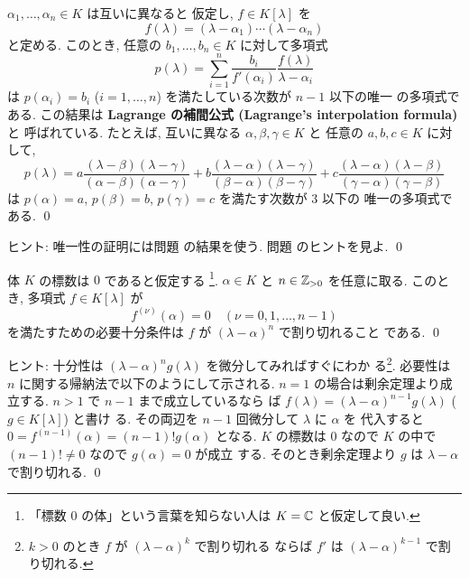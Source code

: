 \documentclass[12pt,twoside]{jarticle}
\begin{document}
\begin{question}
\label{q:Lagrange-interpolation-2}
  $\alpha_1,\dots,\alpha_n\in K$ は互いに異なると
  仮定し, $f\in K[\lambda]$ を
  \begin{equation*}
    f(\lambda)=(\lambda-\alpha_1)\cdots(\lambda-\alpha_n)
  \end{equation*}
  と定める. このとき, 任意の $b_1,\dots,b_n\in K$ に対して多項式
  \begin{equation*}
    p(\lambda) = 
    \sum_{i=1}^n 
    \frac{b_i}{f'(\alpha_i)}
    \frac{f(\lambda)}{\lambda-\alpha_i}
  \end{equation*}
  は $p(\alpha_i)=b_i$ ($i=1,\dots,n$) を満たしている次数が $n-1$ 以下の唯一
  の多項式である.
  この結果は {\bf Lagrange の補間公式 (Lagrange's interpolation formula)} と
  呼ばれている.   
  たとえば, 互いに異なる $\alpha,\beta,\gamma\in K$ と
  任意の $a,b,c\in K$ に対して,
  \begin{equation*}
    p(\lambda)=
    a \frac{(\lambda-\beta)(\lambda-\gamma)}{(\alpha-\beta)(\alpha-\gamma)} +
    b \frac{(\lambda-\alpha)(\lambda-\gamma)}{(\beta-\alpha)(\beta-\gamma)} +
    c \frac{(\lambda-\alpha)(\lambda-\beta)}{(\gamma-\alpha)(\gamma-\beta)} 
  \end{equation*}
  は $p(\alpha)=a$, $p(\beta)=b$, $p(\gamma)=c$ を満たす次数が $3$ 以下の
  唯一の多項式である. 
  \qed
\end{question}

\noindent
ヒント: 唯一性の証明には問題  の結果を使う.
問題  のヒントを見よ.
\qed


\begin{question}
\label{q:Lagrange-interpolation-3}
  体 $K$ の標数は $0$ であると仮定する%
  \footnote{「標数 $0$ の体」という言葉を知らない人は $K={\mathbb C}$ と仮定して良い.}.
  $\alpha\in K$ と $n\in{\mathbb Z}_{>0}$ を任意に取る.
  このとき, 多項式 $f\in K[\lambda]$ が
  \begin{equation*}
    f^{(\nu)}(\alpha) = 0
    \quad (\nu=0,1,\dots,n-1)
  \end{equation*}
  を満たすための必要十分条件は $f$ が $(\lambda-\alpha)^n$ で割り切れること
  である. 
  \qed
\end{question}

\noindent
ヒント: 十分性は $(\lambda-\alpha)^n g(\lambda)$ を微分してみればすぐにわか
る\footnote{$k>0$ のとき $f$ が $(\lambda-\alpha)^k$ で割り切れる
ならば $f'$ は $(\lambda-\alpha)^{k-1}$ で割り切れる.}. 
必要性は $n$ に関する帰納法で以下のようにして示される.
$n=1$ の場合は剰余定理より成立する. $n>1$ で $n-1$ まで成立しているなら
ば $f(\lambda)=(\lambda-\alpha)^{n-1}g(\lambda)$ ($g\in K[\lambda]$) と書け
る.  その両辺を $n-1$ 回微分して $\lambda$ に $\alpha$ を
代入すると $0=f^{(n-1)}(\alpha)=(n-1)!g(\alpha)$ となる.
$K$ の標数は $0$ なので $K$ の中で $(n-1)!\ne 0$ なので $g(\alpha)=0$ が成立
する.  そのとき剰余定理より $g$ は $\lambda-\alpha$ で割り切れる.
\qed
\end{document}
